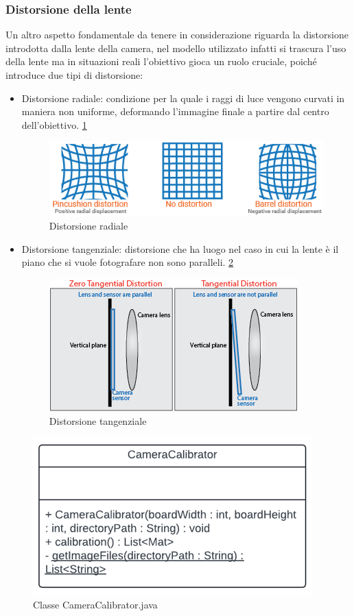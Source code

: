 \documentclass[12pt,a4paper,openright,twoside]{book}
\begin{document}
\subsubsection{Distorsione della lente}
Un altro aspetto fondamentale da tenere in considerazione riguarda la distorsione introdotta dalla lente della camera, nel modello utilizzato infatti si trascura l'uso della lente ma in situazioni reali l'obiettivo gioca un ruolo cruciale, poiché introduce due tipi di distorsione:
\begin{itemize}
	\item Distorsione radiale: condizione per la quale i raggi di luce vengono curvati in maniera non uniforme, deformando l'immagine finale a partire dal centro dell'obiettivo. \ref{fig:radial_distortion}
	\begin{figure}
		\centering
		\includegraphics[width=0.5\linewidth]{./figures/radial_distortion.png}
		\caption{Distorsione radiale}
		\label{fig:radial_distortion}
	\end{figure}
	\item  Distorsione tangenziale: distorsione che ha luogo nel caso in cui la lente è il piano che si vuole fotografare non sono paralleli. \ref{fig:tangential_distortion}
	\begin{figure}
		\centering
		\includegraphics[width=0.5\linewidth]{./figures/tangential_distortion.png}
		\caption{Distorsione tangenziale}
		\label{fig:tangential_distortion}
	\end{figure}
\end{itemize} 
\begin{figure}
	\centering
	\includegraphics[width=0.5\linewidth]{./figures/UML/cameraCalibrator.png}
	\caption{Classe CameraCalibrator.java}
	\label{fig:camera_calibrator}
\end{figure}
\end{document}
